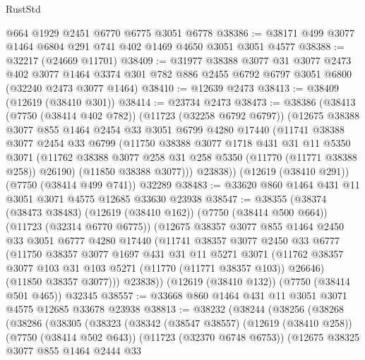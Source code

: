\begin{lexlean}{RustStd}
\begin{coremodule}
    @664
    @1929
    @2451
    @6770
    @6775
    @3051
    @6778
@38386 := @38171 @499 @3077 @1464 @6804 @291 @741 @402 @1469 @4650 @3051 @3051 @4577
@38388 := @32217 (@24669 @11701)
@38409 := @31977
    @38388
    @3077
    @31
    @3077
    @2473
    @402
    @3077
    @1464
    @3374
    @301
    @782
    @886
    @2455
    @6792
    @6797
    @3051
    @6800
    (@32240 @2473 @3077 @1464)
@38410 := @12639 @2473
@38413 := @38409 (@12619 (@38410 @301))
@38414 := @23734 @2473
@38473 := @38386
    (@38413
      (@7750 (@38414 @402 @782))
      (@11723 (@32258 @6792 @6797))
      (@12675
        @38388
        @3077
        @855
        @1464
        @2454
        @33
        @3051
        @6799
        @4280
        @17440
        (@11741
          @38388
          @3077
          @2454
          @33
          @6799
          (@11750
            @38388
            @3077
            @1718
            @431
            @31
            @11
            @5350
            @3071
            (@11762 @38388 @3077 @258 @31 @258 @5350 (@11770 (@11771 @38388 @258)) @26190)
            (@11850 @38388 @3077)))
        @23838))
    (@12619 (@38410 @291))
    (@7750 (@38414 @499 @741))
    @32289
@38483 := @33620 @860 @1464 @431 @11 @3051 @3071 @4575 @12685 @33630 @23938
@38547 := @38355
    (@38374
      (@38473 @38483)
      (@12619 (@38410 @162))
      (@7750 (@38414 @500 @664))
      (@11723 (@32314 @6770 @6775))
      (@12675
        @38357
        @3077
        @855
        @1464
        @2450
        @33
        @3051
        @6777
        @4280
        @17440
        (@11741
          @38357
          @3077
          @2450
          @33
          @6777
          (@11750
            @38357
            @3077
            @1697
            @431
            @31
            @11
            @5271
            @3071
            (@11762 @38357 @3077 @103 @31 @103 @5271 (@11770 (@11771 @38357 @103)) @26646)
            (@11850 @38357 @3077)))
        @23838))
    (@12619 (@38410 @132))
    (@7750 (@38414 @501 @465))
    @32345
@38557 := @33668 @860 @1464 @431 @11 @3051 @3071 @4575 @12685 @33678 @23938
@38813 := @38232
    (@38244
      (@38256
        (@38268
          (@38286
            (@38305
              (@38323
                (@38342
                  (@38547 @38557)
                  (@12619 (@38410 @258))
                  (@7750 (@38414 @502 @643))
                  (@11723 (@32370 @6748 @6753))
                  (@12675
                    @38325
                    @3077
                    @855
                    @1464
                    @2444
                    @33

\end{coremodule}
\end{lexlean}
